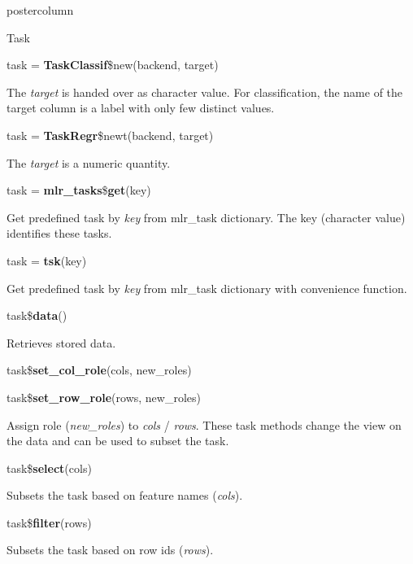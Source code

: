 \documentclass{beamer}
\begin{document}
\begin{frame}[fragile]{}
\begin{columns}
\begin{column}{.245\textwidth}
\begin{beamercolorbox}[center]{postercolumn}
\begin{minipage}{.98\textwidth}
{\begin{myblock}{Task}
\begin{codebox}
							task = \textbf{TaskClassif}\$new(backend, target)
						\end{codebox}
						The \textit{target} is handed over as character value. For classification, the name of the target column is a label with only few distinct values.
						\\
						\begin{codebox}
							task = \textbf{TaskRegr}\$newt(backend, target)
						\end{codebox}
						The \textit{target} is a numeric quantity.
						\\
						\begin{codebox}
							task = \textbf{mlr\_tasks}\$\textbf{get}(key)
						\end{codebox}
						Get predefined task by \textit{key} from mlr\_task dictionary. The key (character value) identifies these tasks. 
						\\
						\begin{codebox}
							task = \textbf{tsk}(key)
						\end{codebox}
						Get predefined task by \textit{key} from mlr\_task dictionary with convenience function.
						\\
						\begin{codebox}
							task\$\textbf{data}()
						\end{codebox}
						Retrieves stored data.
						\\
						\begin{codebox}
							task\$\textbf{set\_col\_role}(cols, new\_roles)
						\end{codebox}
						\begin{codebox}
							task\$\textbf{set\_row\_role}(rows, new\_roles)
						\end{codebox}
						 Assign role (\textit{new\_roles}) to \textit{cols} / \textit{rows}. These task methods change the view on the data and can be used to subset the task.
						\\
						\begin{codebox}
							task\$\textbf{select}(cols)
						\end{codebox}
						Subsets the task based on feature names (\textit{cols}).
						\\
						\begin{codebox}
							task\$\textbf{filter}(rows)
						\end{codebox}
						Subsets the task based on row ids (\textit{rows}).
					\end{myblock}
					\vfill
				}
			\end{minipage}

\end{beamercolorbox}
\end{column}
\end{columns}
\end{frame}
\end{document}
